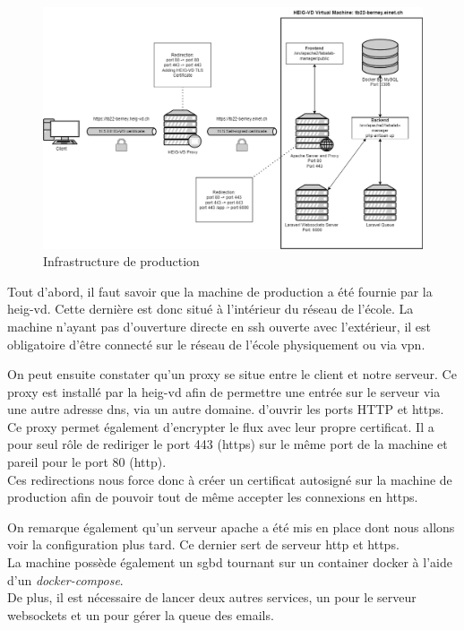 \documentclass[
    iai, %
    il, %
]{heig-tb}
\begin{document}
\begin{center}
    \begin{figure}
        \includegraphics[width=\textwidth]{./assets/figures/prod-infra.png}
        \caption{Infrastructure de production \label{prod-infra}}
    \end{figure}
\end{center}

Tout d'abord, il faut savoir que la machine de production a été fournie par la \Gls{heig-vd}. Cette dernière est donc situé à l'intérieur du réseau de l'école. La machine n'ayant pas d'ouverture directe en \Gls{ssh} ouverte avec l'extérieur, il est obligatoire d'être connecté sur le réseau de l'école physiquement ou via \Gls{vpn}.

On peut ensuite constater qu'un \Gls{proxy} se situe entre le client et notre serveur. Ce \Gls{proxy} est installé par la \Gls{heig-vd} afin de permettre une entrée sur le serveur via une autre adresse \Gls{dns}, via un autre domaine. d'ouvrir les ports HTTP et \Gls{https}. \\
Ce \Gls{proxy} permet également d'encrypter le flux avec leur propre certificat. Il a pour seul rôle de rediriger le port 443 (\Gls{https}) sur le même port de la machine et pareil pour le port 80 (\Gls{http}). \\
Ces redirections nous force donc à créer un certificat autosigné sur la machine de production afin de pouvoir tout de même accepter les connexions en \Gls{https}.

On remarque également qu'un serveur \Gls{apache} a été mis en place dont nous allons voir la configuration plus tard. Ce dernier sert de serveur \Gls{http} et \Gls{https}. \\
La machine possède également un \Gls{sgbd} tournant sur un container \Gls{docker} à l'aide d'un \emph{docker-compose}. \\
De plus, il est nécessaire de lancer deux autres services, un pour le serveur \Gls{websockets} et un pour gérer la queue des emails.
\end{document}
